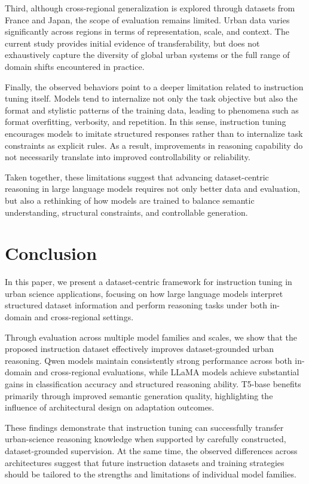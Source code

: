 \documentclass[a4paper,fleqn]{cas-sc}
\begin{document}
Third, although cross-regional generalization is explored through datasets from France and Japan, the scope of evaluation remains limited. Urban data varies significantly across regions in terms of representation, scale, and context. The current study provides initial evidence of transferability, but does not exhaustively capture the diversity of global urban systems or the full range of domain shifts encountered in practice.

Finally, the observed behaviors point to a deeper limitation related to instruction tuning itself. Models tend to internalize not only the task objective but also the format and stylistic patterns of the training data, leading to phenomena such as format overfitting, verbosity, and repetition. In this sense, instruction tuning encourages models to imitate structured responses rather than to internalize task constraints as explicit rules. As a result, improvements in reasoning capability do not necessarily translate into improved controllability or reliability.

Taken together, these limitations suggest that advancing dataset-centric reasoning in large language models requires not only better data and evaluation, but also a rethinking of how models are trained to balance semantic understanding, structural constraints, and controllable generation.

\section{Conclusion}

In this paper, we present a dataset-centric framework for instruction tuning in urban science applications, focusing on how large language models interpret structured dataset information and perform reasoning tasks under both in-domain and cross-regional settings.

Through evaluation across multiple model families and scales, we show that the proposed instruction dataset effectively improves dataset-grounded urban reasoning. Qwen models maintain consistently strong performance across both in-domain and cross-regional evaluations, while LLaMA models achieve substantial gains in classification accuracy and structured reasoning ability. T5-base benefits primarily through improved semantic generation quality, highlighting the influence of architectural design on adaptation outcomes.

These findings demonstrate that instruction tuning can successfully transfer urban-science reasoning knowledge when supported by carefully constructed, dataset-grounded supervision. At the same time, the observed differences across architectures suggest that future instruction datasets and training strategies should be tailored to the strengths and limitations of individual model families.
\end{document}
